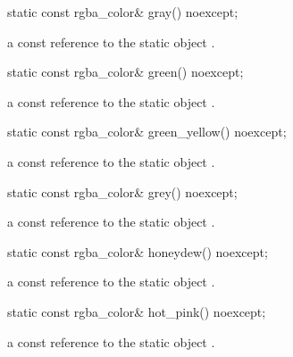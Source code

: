 \begin{itemdecl}
static const rgba_color& gray() noexcept;
\end{itemdecl}
\begin{itemdescr}
\pnum
\returns
a const reference to the static  object .
\end{itemdescr}

\begin{itemdecl}
static const rgba_color& green() noexcept;
\end{itemdecl}
\begin{itemdescr}
\pnum
\returns
a const reference to the static  object .
\end{itemdescr}

\begin{itemdecl}
static const rgba_color& green_yellow() noexcept;
\end{itemdecl}
\begin{itemdescr}
\pnum
\returns
a const reference to the static  object .
\end{itemdescr}

\begin{itemdecl}
static const rgba_color& grey() noexcept;
\end{itemdecl}
\begin{itemdescr}
\pnum
\returns
a const reference to the static  object .
\end{itemdescr}

\begin{itemdecl}
static const rgba_color& honeydew() noexcept;
\end{itemdecl}
\begin{itemdescr}
\pnum
\returns
a const reference to the static  object .
\end{itemdescr}

\begin{itemdecl}
static const rgba_color& hot_pink() noexcept;
\end{itemdecl}
\begin{itemdescr}
\pnum
\returns
a const reference to the static  object .
\end{itemdescr}

